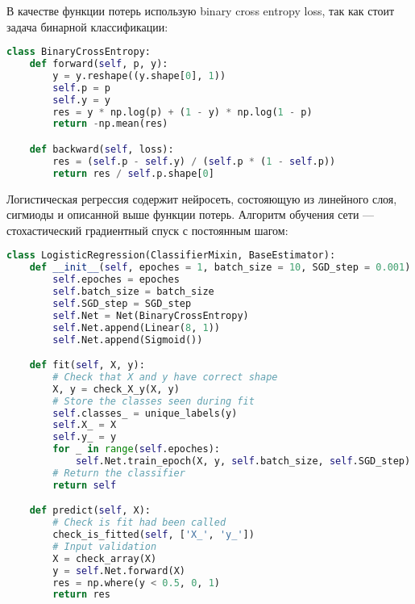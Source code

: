 В качестве функции потерь использую binary cross entropy loss, так как стоит задача бинарной классификации:
\begin{lstlisting}[language=Python]
class BinaryCrossEntropy:
    def forward(self, p, y):
        y = y.reshape((y.shape[0], 1))
        self.p = p
        self.y = y
        res = y * np.log(p) + (1 - y) * np.log(1 - p)
        return -np.mean(res)

    def backward(self, loss):
        res = (self.p - self.y) / (self.p * (1 - self.p))
        return res / self.p.shape[0]
\end{lstlisting}
Логистическая регрессия содержит нейросеть, состояющую из линейного слоя, сигмиоды и описанной выше функции потерь. Алгоритм обучения сети --- стохастический градиентный спуск с постоянным шагом:
\begin{lstlisting}[language=Python]
class LogisticRegression(ClassifierMixin, BaseEstimator):
    def __init__(self, epoches = 1, batch_size = 10, SGD_step = 0.001):
        self.epoches = epoches
        self.batch_size = batch_size
        self.SGD_step = SGD_step
        self.Net = Net(BinaryCrossEntropy)
        self.Net.append(Linear(8, 1))
        self.Net.append(Sigmoid())

    def fit(self, X, y):
        # Check that X and y have correct shape
        X, y = check_X_y(X, y)
        # Store the classes seen during fit
        self.classes_ = unique_labels(y)
        self.X_ = X
        self.y_ = y
        for _ in range(self.epoches):
            self.Net.train_epoch(X, y, self.batch_size, self.SGD_step)
        # Return the classifier
        return self

    def predict(self, X):
        # Check is fit had been called
        check_is_fitted(self, ['X_', 'y_'])
        # Input validation
        X = check_array(X)
        y = self.Net.forward(X)
        res = np.where(y < 0.5, 0, 1)
        return res
\end{lstlisting}
\pagebreak

